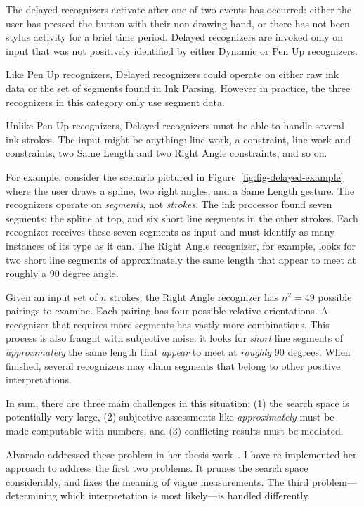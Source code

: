 The delayed recognizers activate after one of two events has occurred:
either the user has pressed the button with their non-drawing hand, or
there has not been stylus activity for a brief time period. Delayed
recognizers are invoked only on input that was not positively
identified by either Dynamic or Pen Up recognizers.

Like Pen Up recognizers, Delayed recognizers could operate on either
raw ink data or the set of segments found in Ink Parsing. However in
practice, the three recognizers in this category only use segment
data.

Unlike Pen Up recognizers, Delayed recognizers must be able to handle
several ink strokes. The input might be anything: line work, a
constraint, line work and constraints, two Same Length and two Right
Angle constraints, and so on. 



For example, consider the scenario pictured in
Figure~\ref{fig:fig-delayed-example} where the user draws a spline,
two right angles, and a Same Length gesture. The recognizers operate
on \textit{segments}, not \textit{strokes}. The ink processor found
seven segments: the spline at top, and six short line segments in the
other strokes. Each recognizer receives these seven segments as input
and must identify as many instances of its type as it can. The Right
Angle recognizer, for example, looks for two short line segments of
approximately the same length that appear to meet at roughly a 90
degree angle. 

Given an input set of $n$ strokes, the Right Angle recognizer has
$n^2=49$ possible pairings to examine. Each pairing has four possible
relative orientations. A recognizer that requires more segments has
vastly more combinations. This process is also fraught with subjective
noise: it looks for \textit{short} line segments of
\textit{approximately} the same length that \textit{appear} to meet at
\textit{roughly} 90 degrees. When finished, several recognizers may
claim segments that belong to other positive interpretations.

In sum, there are three main challenges in this situation: (1) the
search space is potentially very large, (2) subjective assessments
like \textit{approximately} must be made computable with numbers, and
(3) conflicting results must be mediated.

Alvarado addressed these problem in her thesis
work~\cite[Ch. 4]{alvarado-phd-thesis}. I have re-implemented her
approach to address the first two problems. It prunes the search space
considerably, and fixes the meaning of vague measurements. The third
problem---determining which interpretation is most likely---is handled
differently.

